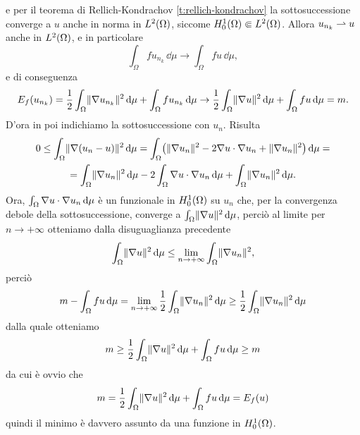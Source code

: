 e per il teorema di Rellich-Kondrachov \ref{t:rellich-kondrachov} la sottosuccessione converge a $u$ anche in norma in $\leb[2]{\Omega}$, siccome $\sobHc[1]{\Omega}\cemb\leb[2]{\Omega}$.
Allora $u_{n_k}\weakto u$ anche in $\leb[2]{\Omega}$, e in particolare
\begin{equation}
    \int_\Omega fu_{n_k}\,\dd\mu\to\int_\Omega fu\,\dd\mu,
\end{equation}
e di conseguenza
\begin{equation}
    E_f(u_{n_k})=
    \frac12\int_\Omega\norm{\grad u_{n_k}}^2\,\dd\mu+\int_\Omega fu_{n_k}\,\dd\mu\to
    \frac12\int_\Omega\norm{\grad u}^2\,\dd\mu+\int_\Omega fu\,\dd\mu=
    m.
\end{equation}
D'ora in poi indichiamo la sottosuccessione con $u_n$.
Risulta
\begin{multline}
    0\le
    \int_\Omega\norm{\grad(u_n-u)}^2\,\dd\mu=
    \int_\Omega\bigl(\norm{\grad u_n}^2-2\scalar{\grad u}{\grad u_n}+\norm{\grad u_n}^2\bigr)\,\dd\mu=\\=
    \int_\Omega\norm{\grad u_n}^2\,\dd\mu-2\int_\Omega\scalar{\grad u}{\grad u_n}\,\dd\mu+\int_\Omega\norm{\grad u_n}^2\,\dd\mu.
\end{multline}
Ora, $\int_\Omega\scalar{\grad u}{\grad u_n}\,\dd\mu$ è un funzionale in $\sobHc[1]{\Omega}$ su $u_n$ che, per la convergenza debole della sottosuccessione, converge a $\int_\Omega\norm{\grad u}^2\,\dd\mu$, perciò al limite per $n\to+\infty$ otteniamo dalla disuguaglianza precedente
\begin{equation}
    \int_\Omega\norm{\grad u}^2\,\dd\mu \le \lim_{n\to+\infty}\int_\Omega\norm{\grad u_n}^2,
\end{equation}
perciò
\begin{equation}
    m-\int_\Omega fu\,\dd\mu=
    \lim_{n\to+\infty}\frac12\int_\Omega\norm{\grad u_n}^2\,\dd\mu\ge
    \frac12\int_\Omega\norm{\grad u_n}^2\,\dd\mu
\end{equation}
dalla quale otteniamo
\begin{equation}
    m\ge
    \frac12\int_\Omega\norm{\grad u}^2\,\dd\mu+\int_\Omega fu\,\dd\mu\ge
    m
\end{equation}
da cui è ovvio che
\begin{equation}
    m=\frac12\int_\Omega\norm{\grad u}^2\,\dd\mu+\int_\Omega fu\,\dd\mu=E_f(u)
\end{equation}
quindi il minimo è davvero assunto da una funzione in $\sobHc[1]{\Omega}$.


